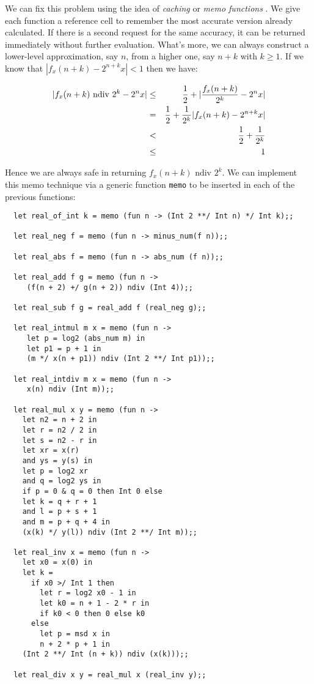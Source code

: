 We can fix this problem using the idea of {\em caching} or {\em memo
functions} \cite{michie-memo}. We give each function a reference cell to
remember the most accurate version already calculated. If there is a second
request for the same accuracy, it can be returned immediately without further
evaluation. What's more, we can always construct a lower-level approximation,
say $n$, from a higher one, say $n + k$ with $k \geq 1$. If we know that
$|f_x(n + k) - 2^{n + k} x| < 1$ then we have:

\begin{eqnarray*}
|f_x(n + k) \mbox{ ndiv } 2^ k - 2^n x|
& \leq & {1 \over 2} + |{f_x(n + k) \over 2^k} - 2^n x|                 \\
& =    & {1 \over 2} + {1 \over 2^k} |f_x(n + k) - 2^{n + k} x|         \\
& <    & {1 \over 2} + {1 \over 2^k}                                    \\
& \leq & 1
\end{eqnarray*}

Hence we are always safe in returning $f_x(n + k) \mbox{ ndiv } 2^k$. We can
implement this memo technique via a generic function {\tt memo} to be inserted
in each of the previous functions:

\begin{boxed}\begin{lstlisting}
  let real_of_int k = memo (fun n -> (Int 2 **/ Int n) */ Int k);;

  let real_neg f = memo (fun n -> minus_num(f n));;

  let real_abs f = memo (fun n -> abs_num (f n));;

  let real_add f g = memo (fun n ->
     (f(n + 2) +/ g(n + 2)) ndiv (Int 4));;

  let real_sub f g = real_add f (real_neg g);;

  let real_intmul m x = memo (fun n ->
     let p = log2 (abs_num m) in
     let p1 = p + 1 in
     (m */ x(n + p1)) ndiv (Int 2 **/ Int p1));;

  let real_intdiv m x = memo (fun n ->
     x(n) ndiv (Int m));;

  let real_mul x y = memo (fun n ->
    let n2 = n + 2 in
    let r = n2 / 2 in
    let s = n2 - r in
    let xr = x(r)
    and ys = y(s) in
    let p = log2 xr
    and q = log2 ys in
    if p = 0 & q = 0 then Int 0 else
    let k = q + r + 1
    and l = p + s + 1
    and m = p + q + 4 in
    (x(k) */ y(l)) ndiv (Int 2 **/ Int m));;

  let real_inv x = memo (fun n ->
    let x0 = x(0) in
    let k =
      if x0 >/ Int 1 then
        let r = log2 x0 - 1 in
        let k0 = n + 1 - 2 * r in
        if k0 < 0 then 0 else k0
      else
        let p = msd x in
        n + 2 * p + 1 in
    (Int 2 **/ Int (n + k)) ndiv (x(k)));;

  let real_div x y = real_mul x (real_inv y);;
\end{lstlisting}\end{boxed}

